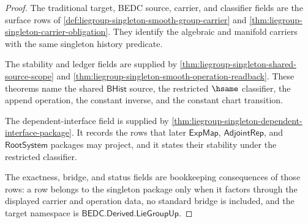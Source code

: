 \begin{proof}
The traditional target, BEDC source, carrier, and classifier fields are the
surface rows of \autoref{def:liegroup-singleton-smooth-group-carrier} and
\autoref{thm:liegroup-singleton-carrier-obligation}. They identify the
algebraic and manifold carriers with the same singleton history predicate.

The stability and ledger fields are supplied by
\autoref{thm:liegroup-singleton-shared-source-scope} and
\autoref{thm:liegroup-singleton-smooth-operation-readback}. These theorems name
the shared $\mathsf{BHist}$ source, the restricted $\hsame$ classifier, the
append operation, the constant inverse, and the constant chart transition.

The dependent-interface field is supplied by
\autoref{thm:liegroup-singleton-dependent-interface-package}. It records the
rows that later $\mathsf{ExpMap}$, $\mathsf{AdjointRep}$, and
$\mathsf{RootSystem}$ packages may
project, and it states their stability under the restricted classifier.

The exactness, bridge, and status fields are bookkeeping consequences of those
rows: a row belongs to the singleton package only when it factors through the
displayed carrier and operation data, no standard bridge is included, and the
target namespace is $\mathsf{BEDC.Derived.LieGroupUp}$.
\end{proof}

